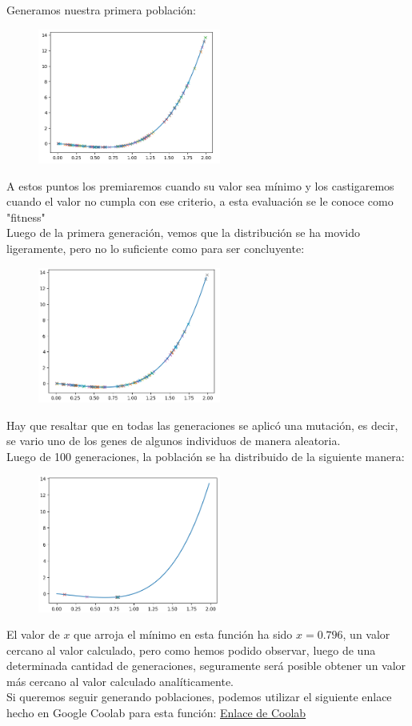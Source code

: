 Generamos nuestra primera población:
    \begin{figure}[h]
       \includegraphics[width=6cm]{Imagenes/p3 1erag.png}
        \centering
    \end{figure}
A estos puntos los premiaremos cuando su valor sea mínimo y los castigaremos cuando el valor no cumpla con ese criterio, a esta evaluación se le conoce como "fitness"
\\
\framebreak
Luego de la primera generación, vemos que la distribución se ha movido ligeramente, pero no lo suficiente como para ser concluyente:
    \begin{figure}[h]
       \includegraphics[width=6cm]{Imagenes/p3 2dag.png}
        \centering
    \end{figure}
Hay que resaltar que en todas las generaciones se aplicó una mutación, es decir, se vario uno de los genes de algunos individuos de manera aleatoria.
\\
\framebreak
Luego de 100 generaciones, la población se ha distribuido de la siguiente manera:
    \begin{figure}[h]
       \includegraphics[width=6cm]{Imagenes/p3 100g.png}
        \centering
    \end{figure}
El valor de $x$ que arroja el mínimo en esta función ha sido $x=0.796$, un valor cercano al valor calculado, pero como hemos podido observar, luego de una determinada cantidad de generaciones, seguramente será posible obtener un valor más cercano al valor calculado analíticamente.
\\Si queremos seguir generando poblaciones, podemos utilizar el siguiente enlace hecho en Google Coolab para esta función: \href{https://colab.research.google.com/drive/1-Qyot1mxXB_5UUK7yPKAN7h3VYBSTotL#scrollTo=u9t-hjTo2aWS}{Enlace de Coolab}
